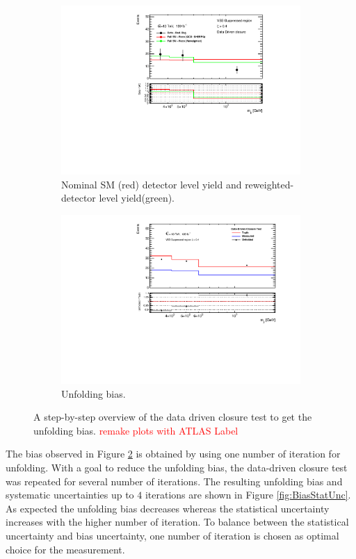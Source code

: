\begin{figure}[htb]
\begin{subfigure}{.48\textwidth}
        \includegraphics[width=.9\linewidth]{figures/Analysis/Unfolding/DDClosure_VBS_Suppressed_Reweighted.pdf}
        \caption{ Nominal SM (red) detector level yield and reweighted-detector level yield(green). \label{fig:ddclosure_DataMCReweighted} }
    \end{subfigure}
    \begin{subfigure}{.48\textwidth}
        \centering
        \includegraphics[width=.9\linewidth]{figures/Analysis/Unfolding/DDClosure_VBS_Suppressed_Bias.pdf}
        \caption{Unfolding bias. \label{fig:ddclosure_FinalBias} }
    \end{subfigure}
    \caption{ A step-by-step overview of the data driven closure test to get the unfolding bias.  \textcolor{red}{remake plots with ATLAS Label} \label{fig:unfolding_ddclosure}}
\end{figure}

The bias observed in Figure \ref{fig:ddclosure_FinalBias} is obtained by using one number of iteration for unfolding. With a goal to reduce the unfolding bias, the data-driven closure test was repeated for several number of iterations. The resulting unfolding bias and systematic uncertainties up to $4$ iterations are shown in Figure \ref{fig:BiasStatUnc}. As expected the unfolding bias decreases whereas the statistical uncertainty increases with the higher number of iteration. To balance between the statistical uncertainty and bias uncertainty, one number of iteration is chosen as optimal choice for the measurement.

